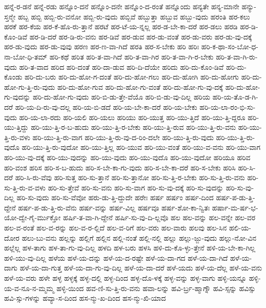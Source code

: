 {ಹನ್ನೆ-ರ-ಡನೆ
ಹನ್ನೆ-ರಡು
ಹನ್ನೊಂ-ದನೆ
ಹನ್ನೊಂ-ದನೇ
ಹನ್ನೊಂ-ದ-ರಂತೆ
ಹನ್ನೊಂದು
ಹನ್ಯತೇ
ಹನ್ಯ-ಮಾನೇ
ಹನ್ಯು-ಸ್ತನ್ಮೇ
ಹಬ್ಬ
ಹಬ್ಬಿ
ಹಬ್ಬಿ-ರು-ವನೋ
ಹಬ್ಬಿ-ರು-ವುದು
ಹಬ್ಬಿವೆ
ಹಬ್ಬುತ್ತಾ
ಹಬ್ಬುವ
ಹಬ್ಬು-ವುದು
ಹರಂತಿ
ಹರ-ಕಲು
ಹರಕೆ
ಹರ-ಕೆಯ
ಹರ-ಕೆ-ಹೊ-ರು-ತ್ತಾನೆ
ಹರಟೆ
ಹರ-ಟೆ-ಯ-ನ್ನಲ್ಲ
ಹರ-ಡ-ಬೇ-ಕಾ-ದರೆ
ಹರ-ಡಲು
ಹರಡಿ
ಹರ-ಡಿ-ಕೊಂ-ಡಿವೆ
ಹರ-ಡಿ-ದರೆ
ಹರ-ಡಿ-ರು-ವನು
ಹರ-ಡಿವೆ
ಹರ-ಡುವ
ಹರ-ಡು-ವಂತೆ
ಹರ-ಡು-ವರು
ಹರ-ಡು-ವು-ದಕ್ಕೆ
ಹರ-ಡು-ವುದು
ಹರ-ಡು-ವುವು
ಹರಣ
ಹರ-ಣ-ವಾ-ಗಿದೆ
ಹರತಿ
ಹರ-ಸ-ಬೇಕು
ಹರಿ
ಹರಿಃ
ಹರಿ-ಕ-ಥಾ-ಸಂ-ಬೋ-ಧ-ನಾ-ಬೋ-ಧಿ-ತಮ್
ಹರಿ-ಕಥೆ
ಹರಿತ
ಹರಿ-ತ-ವಾ-ಗಿದೆ
ಹರಿ-ತ-ವಾ-ಗಿರ
ಹರಿ-ತ-ವಾ-ಗಿ-ರ-ಬೇಕು
ಹರಿ-ತ-ವಾ-ಗಿ-ರು-ವುದು
ಹರಿ-ತ-ವಾದ
ಹರಿದ
ಹರಿ-ದಂತೆ
ಹರಿ-ದಾ-ಡುವ
ಹರಿ-ದಿ-ದೆಯೇ
ಹರಿದು
ಹರಿ-ದು-ಕೊಂ-ಡಿವೆ
ಹರಿ-ದು-ಕೊಂಡು
ಹರಿ-ದು-ಬರು
ಹರಿ-ದು-ಹೋ-ಗ-ದಂತೆ
ಹರಿ-ದು-ಹೋ-ಗಲು
ಹರಿ-ದು-ಹೋಗಿ
ಹರಿ-ದು-ಹೋಗು
ಹರಿ-ದು-ಹೋ-ಗು-ತ್ತಿ-ರು-ವುದು
ಹರಿ-ದು-ಹೋ-ಗುವ
ಹರಿ-ದು-ಹೋ-ಗು-ವಂತೆ
ಹರಿ-ದು-ಹೋ-ಗು-ವು-ದಕ್ಕೆ
ಹರಿ-ದು-ಹೋ-ಗು-ವುದನ್ನು
ಹರಿ-ದು-ಹೋ-ಗು-ವುದು
ಹರಿ-ಬಿ-ಡು-ತ್ತೇ-ವೆಯೊ
ಹರಿ-ಬಿ-ಡು-ವು-ದಿಲ್ಲ
ಹರಿಯ
ಹರಿ-ಯ-ತೊ-ಡ-ಗಿ-ದರೆ
ಹರಿ-ಯ-ದಿ-ರು-ವು-ದಲ್ಲ
ಹರಿ-ಯ-ಬಿ-ಡದೆ
ಹರಿ-ಯ-ಬೇ-ಕಾ-ದರೆ
ಹರಿ-ಯ-ಬೇಕು
ಹರಿ-ಯ-ಲಾ-ರಂ-ಭಿ-ಸು-ವುದು
ಹರಿ-ಯ-ಲಾ-ರದು
ಹರಿ-ಯಲಿ
ಹರಿ-ಯಲು
ಹರಿಯು
ಹರಿ-ಯುತ್ತ
ಹರಿ-ಯು-ತ್ತಿದೆ
ಹರಿ-ಯು-ತ್ತಿ-ದ್ದರೂ
ಹರಿ-ಯು-ತ್ತಿದ್ದು
ಹರಿ-ಯು-ತ್ತಿ-ರ-ಬ-ಹುದು
ಹರಿ-ಯು-ತ್ತಿ-ರ-ಬೇಕು
ಹರಿ-ಯು-ತ್ತಿ-ರುವ
ಹರಿ-ಯು-ತ್ತಿ-ರು-ವನು
ಹರಿ-ಯು-ತ್ತಿ-ರು-ವಳು
ಹರಿ-ಯು-ತ್ತಿ-ರು-ವಾಗ
ಹರಿ-ಯು-ತ್ತಿ-ರು-ವು-ದ-ರಿಂ-ದಲೇ
ಹರಿ-ಯು-ತ್ತಿ-ರು-ವುದು
ಹರಿ-ಯು-ತ್ತಿ-ರು-ವುದೊ
ಹರಿ-ಯು-ತ್ತಿ-ರು-ವುದೋ
ಹರಿ-ಯು-ತ್ತಿಲ್ಲ
ಹರಿ-ಯುವ
ಹರಿ-ಯು-ವಂತೆ
ಹರಿ-ಯು-ವ-ವನು
ಹರಿ-ಯು-ವಾಗ
ಹರಿ-ಯು-ವು-ದಕ್ಕೆ
ಹರಿ-ಯು-ವುದನ್ನು
ಹರಿ-ಯು-ವುದು
ಹರಿ-ಯು-ವುದೊ
ಹರಿ-ಯು-ವುದೋ
ಹರಿಯೂ
ಹರಿವ
ಹರಿ-ವಂಶ
ಹರಿಸ
ಹರಿ-ಸ-ಬ-ಹುದು
ಹರಿ-ಸ-ಬೇ-ಕಾ-ಗು-ವುದು
ಹರಿ-ಸ-ಬೇ-ಕಾ-ದರೆ
ಹರಿ-ಸ-ಬೇಕು
ಹರಿಸಿ
ಹರಿ-ಸಿ-ದರೆ
ಹರಿ-ಸಿ-ರು-ವೆವು
ಹರಿ-ಸುತ್ತ
ಹರಿ-ಸು-ತ್ತಾನೆ
ಹರಿ-ಸು-ತ್ತಾನೋ
ಹರಿ-ಸು-ತ್ತಿ-ರ-ಬೇಕು
ಹರಿ-ಸು-ತ್ತಿ-ರು-ವನು
ಹರಿ-ಸು-ತ್ತಿ-ರು-ವ-ವಳು
ಹರಿ-ಸು-ತ್ತೇವೆ
ಹರಿ-ಸು-ವನು
ಹರಿ-ಸು-ವಾಗ
ಹರಿ-ಸು-ವು-ದಕ್ಕೆ
ಹರಿ-ಸು-ವುದನ್ನು
ಹರಿ-ಸು-ವು-ದಿಲ್ಲ
ಹರಿ-ಸು-ವುದು
ಹರಿ-ಸು-ವೆವೋ
ಹರು-ಡು-ತ್ತಿ-ದ್ದುದೇ
ಹರೇಃ
ಹರ್ಷ
ಹರ್ಷಂ
ಹರ್ಷ-ದಿಂದ
ಹರ್ಷ-ಪ-ಡು-ತ್ತಿ-ದ್ದೇನೆ
ಹರ್ಷ-ಪ-ಡು-ತ್ತಿ-ರು-ವೆನು
ಹರ್ಷ-ವನ್ನು
ಹರ್ಷ-ವಿಲ್ಲ
ಹರ್ಷವೂ
ಹರ್ಷ-ಶೋ-ಕಾ-ನ್ವಿತಃ
ಹರ್ಷಾ-ಮ-ರ್ಷ-ಭ-ಯೋ-ದ್ವೇ-ಗೈ-ರ್ಮುಕ್ತೋ
ಹರ್ಷಿ-ತ-ವಾ-ಗಿ-ದ್ದೇನೆ
ಹರ್ಷಿ-ಸು-ವು-ದಿ-ಲ್ಲವೊ
ಹಲ
ಹಲ-ವನ್ನು
ಹಲ-ವನ್ನೇ
ಹಲ-ವರ
ಹಲ-ವ-ರಂತೆ
ಹಲ-ವ-ರನ್ನು
ಹಲ-ವ-ರ-ಲ್ಲಿದೆ
ಹಲ-ವ-ರಿಗೆ
ಹಲ-ವರು
ಹಲ-ವಾರು
ಹಲವು
ಹಲ-ಸಿನ
ಹಲಿ-ಯ-ದೋರ
ಹಲು-ಬು-ವನು
ಹಲ್ಲನ್ನು
ಹಲ್ಲಿಗೆ
ಹಲ್ಲಿನ
ಹಲ್ಲಿ-ನಂತೆ
ಹಲ್ಲಿ-ನಲ್ಲಿ
ಹಲ್ಲು
ಹಲ್ಲು-ಜ್ಜು-ವುದು
ಹಲ್ಲು-ನೋ-ವಿನ
ಹಲ್ಲೆಲ್ಲ
ಹಳ-ತಾಗು
ಹಳ-ತಾ-ಗು-ವು-ದಿಲ್ಲ
ಹಳದಿ
ಹಳ-ಬರು
ಹಳಸಿ
ಹಳಿ-ದು-ಕೊ-ಳ್ಳು-ತ್ತೇನೆ
ಹಳಿ-ಯ-ಬೇ-ಕಾ-ಗಿಲ್ಲ
ಹಳಿ-ಯು-ವು-ದಿಲ್ಲ
ಹಳೆಯ
ಹಳೆ-ಯ-ದನ್ನು
ಹಳೆ-ಯ-ದ-ರಷ್ಟೇ
ಹಳೆ-ಯ-ದಾ-ಗದ
ಹಳೆ-ಯ-ದಾ-ಗಿದೆ
ಹಳೆ-ಯ-ದಾಗು
ಹಳೆ-ಯ-ದಾ-ಗುತ್ತ
ಹಳೆ-ಯ-ದಾ-ಗು-ವು-ದಿಲ್ಲ
ಹಳೆ-ಯ-ದಾ-ದರೆ
ಹಳೆ-ಯದು
ಹಳೆ-ಯ-ದೆಲ್ಲ
ಹಳೆ-ಯ-ವನು
ಹಳೆ-ಯ-ವರು
ಹಳೇ
ಹಳ್ಳ
ಹಳ್ಳಕ್ಕೆ
ಹಳ್ಳ-ದಲ್ಲಿ
ಹಳ್ಳ-ದಿಂದ
ಹಳ್ಳ-ದೊ-ಳಕ್ಕೆ
ಹಳ್ಳ-ವನ್ನು
ಹಳ್ಳ-ವಾಗು
ಹಳ್ಳಿ-ಯನ್ನೂ
ಹಳ್ಳಿ-ಯ-ವ-ನೂ-ನ-ಮ್ಮಮ್ಮ
ಹಳ್ಳಿ-ಯಿಂದ
ಹವ-ಣಿ-ಸು-ತ್ತಿ-ರು-ವನು
ಹವಾ-ಲನ್ನು
ಹವಿ-ರ್ಬ್ರ-ಹ್ಮಾಗ್ನೌ
ಹವಿ-ಸ್ಸನ್ನು
ಹವಿಸ್ಸು
ಹವಿ-ಸ್ಸು-ಗಳನ್ನು
ಹವ್ಯಾ-ಸ-ದಿಂದ
ಹಸ-ನ್ಮು-ಖ-ದಿಂದ
ಹಸ-ನ್ಮು-ಖಿ-ಯಾದ
}
